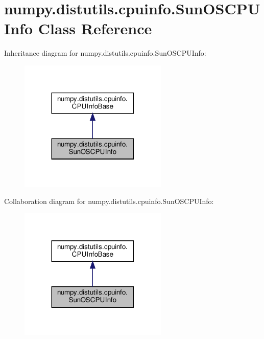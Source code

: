 \hypertarget{classnumpy_1_1distutils_1_1cpuinfo_1_1SunOSCPUInfo}{}\section{numpy.\+distutils.\+cpuinfo.\+Sun\+O\+S\+C\+P\+U\+Info Class Reference}
\label{classnumpy_1_1distutils_1_1cpuinfo_1_1SunOSCPUInfo}


Inheritance diagram for numpy.\+distutils.\+cpuinfo.\+Sun\+O\+S\+C\+P\+U\+Info\+:
\nopagebreak
\begin{figure}[H]
\begin{center}
\leavevmode
\includegraphics[width=200pt]{classnumpy_1_1distutils_1_1cpuinfo_1_1SunOSCPUInfo__inherit__graph}
\end{center}
\end{figure}


Collaboration diagram for numpy.\+distutils.\+cpuinfo.\+Sun\+O\+S\+C\+P\+U\+Info\+:
\nopagebreak
\begin{figure}[H]
\begin{center}
\leavevmode
\includegraphics[width=200pt]{classnumpy_1_1distutils_1_1cpuinfo_1_1SunOSCPUInfo__coll__graph}
\end{center}
\end{figure}
